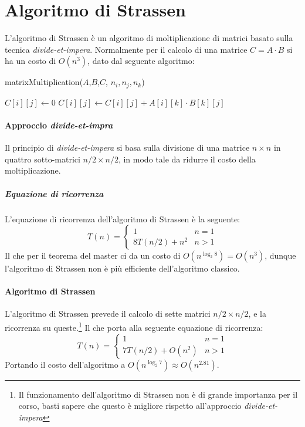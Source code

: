 \section{Algoritmo di Strassen}
    L'algoritmo di Strassen è un algoritmo di moltiplicazione di matrici basato sulla tecnica \textit{divide-et-impera}. Normalmente per il calcolo di una matrice $C = A \cdot B$ si ha un costo di $O(n^3)$, dato dal seguente algoritmo:
    \begin{algorithm}[H]
        \caption{matrixMultiplication(\Float[][] $A$,$B$,$C$, \Int $n_i, n_j, n_k$)}
        \begin{algorithmic}
                \State {}
                    \State $C[i][j] \gets 0$
                        \State $C[i][j] \gets C[i][j] + A[i][k] \cdot B[k][j]$
                    \EndFor
                \EndFor
            \EndFor
        \end{algorithmic}
    \end{algorithm}
    \paragraph{Approccio \textit{divide-et-impra}}Il principio di \textit{divide-et-impera} si basa sulla divisione di una matrice $n\times n$ in quattro sotto-matrici $n/2 \times n/2$, in modo tale da ridurre il costo della moltiplicazione.
    \subparagraph{Equazione di ricorrenza} L'equazione di ricorrenza dell'algoritmo di Strassen è la seguente:
    \[
        T(n)=\begin{cases}
            1 & n = 1\\
            8T(n/2) + n^2 &  n > 1
        \end{cases}
    \]
    Il che per il teorema del master ci da un costo di $O(n^{\log_2 8}) = O(n^3)$, dunque l'algoritmo di Strassen non è più efficiente dell'algoritmo classico.
    \paragraph{Algoritmo di Strassen} L'algoritmo di Strassen prevede il calcolo di sette matrici $n/2 \times n/2$, e la ricorrenza su queste.\footnote{Il funzionamento dell'algoritmo di Strassen non è di grande importanza per il corso, basti sapere che questo è migliore rispetto all'approccio \textit{divide-et-impera}} Il che porta alla seguente equazione di ricorrenza:
    \[
        T(n)=\begin{cases}
            1 & n = 1\\
            7T(n/2) + O(n^2) &  n > 1
        \end{cases}
    \]
    Portando il costo dell'algoritmo a $O(n^{\log_2 7}) \approx O(n^{2.81})$.
    